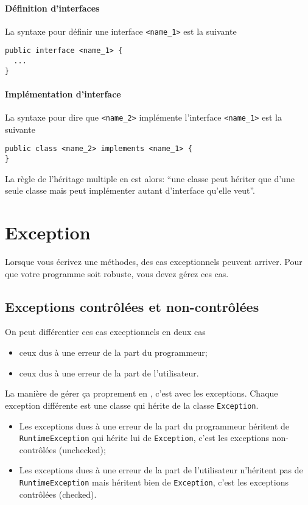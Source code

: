 \paragraph{Définition d'interfaces}
La syntaxe pour définir une interface \lstinline|<name_1>| est la suivante
\begin{lstlisting}
public interface <name_1> {
  ...
}
\end{lstlisting}

\paragraph{Implémentation d'interface} %
La syntaxe pour dire que \lstinline|<name_2>|
implémente l'interface \lstinline|<name_1>| est la suivante
\begin{lstlisting}
public class <name_2> implements <name_1> {
}
\end{lstlisting}

La règle de l'héritage multiple en \java{} est alors:
``une classe peut hériter que d'une seule classe mais peut implémenter
autant d'interface qu'elle veut''.

\section{Exception}
Lorsque vous écrivez une méthodes,
des cas exceptionnels peuvent arriver.
Pour que votre programme soit robuste,
vous devez gérez ces cas.

\subsection{Exceptions contrôlées et non-contrôlées}
On peut différentier ces cas exceptionnels en deux cas
\begin{itemize}
  \item ceux dus à une erreur de la part du programmeur;
  \item ceux dus à une erreur de la part de l'utilisateur.
\end{itemize}

La manière de gérer ça proprement en \java{},
c'est avec les exceptions.
Chaque exception différente est une classe qui hérite de la classe
\lstinline{Exception}.

\begin{itemize}
  \item
    Les exceptions dues à une erreur de la part du programmeur héritent
    de \lstinline{RuntimeException} qui hérite lui de \lstinline{Exception},
    c'est les exceptions non-contrôlées (unchecked);
  \item
    Les exceptions dues à une erreur de la part de l'utilisateur n'héritent
    pas de \lstinline{RuntimeException} mais héritent bien de
    \lstinline{Exception}, c'est les exceptions contrôlées (checked).
\end{itemize}

